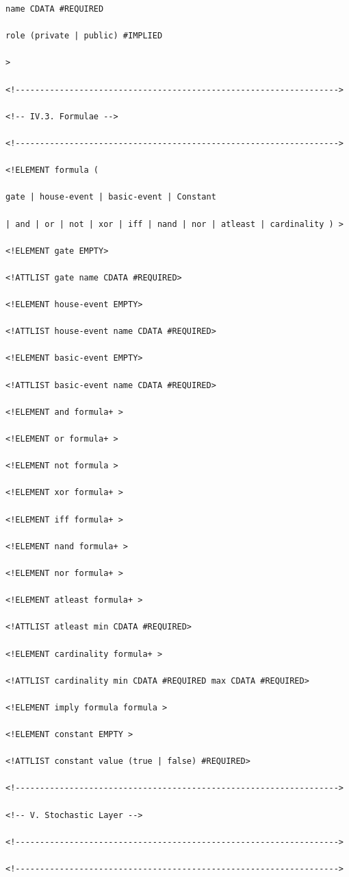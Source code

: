 \documentclass[11pt]{article}
\begin{document}
\begin{lstlisting}
name CDATA #REQUIRED

role (private | public) #IMPLIED

>

<!------------------------------------------------------------------>

<!-- IV.3. Formulae -->

<!------------------------------------------------------------------>

<!ELEMENT formula (

gate | house-event | basic-event | Constant

| and | or | not | xor | iff | nand | nor | atleast | cardinality ) >

<!ELEMENT gate EMPTY>

<!ATTLIST gate name CDATA #REQUIRED>

<!ELEMENT house-event EMPTY>

<!ATTLIST house-event name CDATA #REQUIRED>

<!ELEMENT basic-event EMPTY>

<!ATTLIST basic-event name CDATA #REQUIRED>

<!ELEMENT and formula+ >

<!ELEMENT or formula+ >

<!ELEMENT not formula >

<!ELEMENT xor formula+ >

<!ELEMENT iff formula+ >

<!ELEMENT nand formula+ >

<!ELEMENT nor formula+ >

<!ELEMENT atleast formula+ >

<!ATTLIST atleast min CDATA #REQUIRED>

<!ELEMENT cardinality formula+ >

<!ATTLIST cardinality min CDATA #REQUIRED max CDATA #REQUIRED>

<!ELEMENT imply formula formula >

<!ELEMENT constant EMPTY >

<!ATTLIST constant value (true | false) #REQUIRED>

<!------------------------------------------------------------------>

<!-- V. Stochastic Layer -->

<!------------------------------------------------------------------>

<!------------------------------------------------------------------>


\end{lstlisting}
\end{document}
